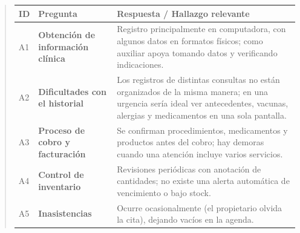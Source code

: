 \documentclass[
]{article}
\newcounter{none} %
\begin{document}
\begin{quote}
{\def\LTcaptype{none} %
\begin{longtable}[]{|
  >{\centering\arraybackslash}p{}|
  >{\raggedright\arraybackslash}p{}|
  >{\raggedright\arraybackslash}p{}|}
\hline
\begin{minipage}[b]{\linewidth}\centering
\textbf{ID}
\end{minipage} & \begin{minipage}[b]{\linewidth}\centering
\textbf{Pregunta}
\end{minipage} & \begin{minipage}[b]{\linewidth}\raggedright
\textbf{Respuesta / Hallazgo relevante}
\end{minipage} \\
\hline
\endhead
\hline
\endlastfoot
A1 & \textbf{Obtención de información clínica} &
\begin{minipage}[t]{\linewidth}\raggedright
Registro principalmente en computadora, con algunos datos en formatos físicos; como auxiliar apoya tomando datos y verificando indicaciones.
\end{minipage} \\
\hline
A2 & \textbf{Dificultades con el historial} &
\begin{minipage}[t]{\linewidth}\raggedright
Los registros de distintas consultas no están organizados de la misma manera; en una urgencia sería ideal ver antecedentes, vacunas, alergias y medicamentos en una sola pantalla.
\end{minipage} \\
\hline
A3 & \textbf{Proceso de cobro y facturación} &
\begin{minipage}[t]{\linewidth}\raggedright
Se confirman procedimientos, medicamentos y productos antes del cobro; hay demoras cuando una atención incluye varios servicios.
\end{minipage} \\
\hline
A4 & \textbf{Control de inventario} &
\begin{minipage}[t]{\linewidth}\raggedright
Revisiones periódicas con anotación de cantidades; no existe una alerta automática de vencimiento o bajo stock.
\end{minipage} \\
\hline
A5 & \textbf{Inasistencias} &
\begin{minipage}[t]{\linewidth}\raggedright
Ocurre ocasionalmente (el propietario olvida la cita), dejando vacíos en la agenda.

\end{minipage}
\end{longtable}}
\end{quote}
\end{document}
